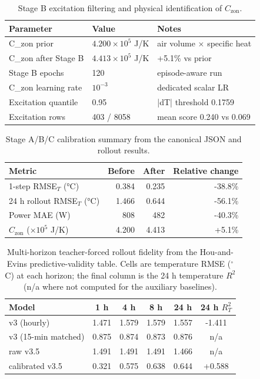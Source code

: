 \documentclass[11pt,a4paper]{article}
\newcommand{\Czon}{\ensuremath{C_{\mathrm{zon}}}}
\begin{document}
\begin{table}[H]
\centering
\small
\caption{Stage B excitation filtering and physical identification of \(\Czon\).}
\label{tab:stage-b}
\begin{tabularx}{\linewidth}{llX}
\toprule
Parameter & Value & Notes \\
\midrule
C\_zon prior & $4.200\times10^5$ J/K & air volume $\times$ specific heat \\
C\_zon after Stage B & $4.413\times10^5$ J/K & +5.1\% vs prior \\
Stage B epochs & 120 & episode-aware run \\
C\_zon learning rate & $10^{-3}$ & dedicated scalar LR \\
Excitation quantile & 0.95 & |dT| threshold 0.1759 \\
Excitation rows & 403 / 8058 & mean score 0.240 vs 0.069 \\
\bottomrule
\end{tabularx}
\end{table}
\begin{table}[H]
\centering
\small
\caption{Stage A/B/C calibration summary from the canonical JSON and rollout results.}
\label{tab:stage-abc}
\begin{tabular}{lrrr}
\toprule
Metric & Before & After & Relative change \\
\midrule
1-step RMSE$_T$ (\si{\celsius}) & 0.384 & 0.235 & -38.8\% \\
24 h rollout RMSE$_T$ (\si{\celsius}) & 1.466 & 0.644 & -56.1\% \\
Power MAE (\si{\watt}) & 808 & 482 & -40.3\% \\
$\Czon$ ($\times 10^5$ J/K) & 4.200 & 4.413 & +5.1\% \\
\bottomrule
\end{tabular}
\end{table}
\begin{table}[H]
\centering
\small
\caption{Multi-horizon teacher-forced rollout fidelity from the Hou-and-Evins predictive-validity table. Cells are temperature RMSE (\(^\circ\)C) at each horizon; the final column is the 24 h temperature \(R^2\) (n/a where not computed for the auxiliary baselines).}
\label{tab:multi-horizon}
\begin{tabular}{lccccc}
\toprule
Model & 1 h & 4 h & 8 h & 24 h & 24 h \(R^2_T\) \\
\midrule
v3 (hourly) & 1.471 & 1.579 & 1.579 & 1.557 & -1.411 \\
v3 (15-min matched) & 0.875 & 0.874 & 0.873 & 0.876 & n/a \\
raw v3.5 & 1.491 & 1.491 & 1.491 & 1.466 & n/a \\
calibrated v3.5 & 0.321 & 0.575 & 0.638 & 0.644 & +0.588 \\
\bottomrule
\end{tabular}
\end{table}
\end{document}
